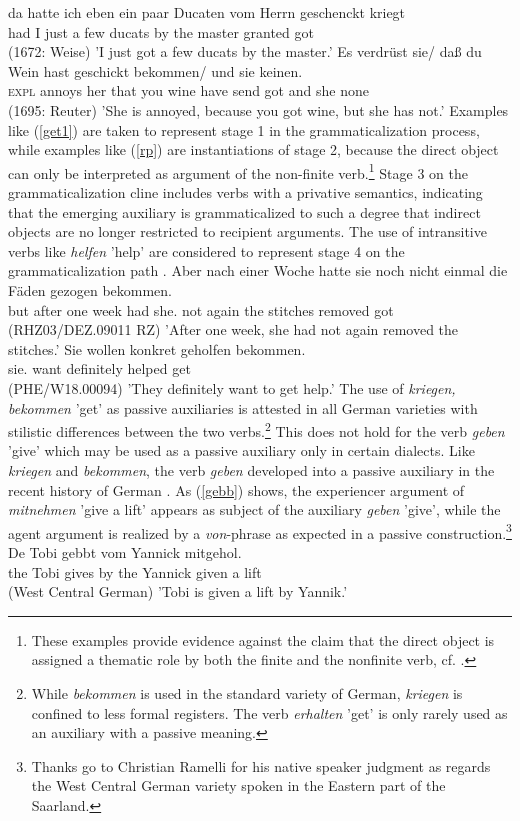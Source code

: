 \documentclass[output=paper]{langsci/langscibook}
\begin{document}
\eal \label{get1}
\ex
\gll da hatte ich eben ein paar Ducaten vom Herrn geschenckt kriegt \\  \expl{} had I just a few ducats {by the} master granted got   \\   \hfill (1672: Weise)
\glt 'I just got a few ducats by the master.' 
\ex
\gll  Es verdrüst sie/ daß du Wein hast geschickt bekommen/ und sie keinen.  \\  \textsc{expl} annoys her that you wine have send got and she none  \\ \hfill (1695: Reuter)
\glt 'She is annoyed, because you got wine, but she has not.'
\zl
Examples like (\ref{get1}) are taken to represent stage 1 in the grammaticalization process, while examples like (\ref{rp}) are instantiations of stage 2, because the direct object can only be interpreted as argument of the non-finite verb.\footnote{These examples provide evidence against the claim that the direct object is assigned a thematic role by both the finite and the nonfinite verb, cf. \cite{haider1986}.} Stage 3 on the grammaticalization cline includes verbs with a privative semantics, indicating that the emerging auxiliary is grammaticalized to such a degree that indirect objects are no longer restricted to recipient arguments. The use of intransitive verbs like \textit{helfen} 'help' are considered to represent stage 4 on the grammaticalization path \citep{ebert78}.
\eal \label{intrans}
\ex
\gll Aber nach einer Woche hatte sie {noch nicht einmal} die Fäden gezogen bekommen.  \\ but after one week had she.\nom {} {not again} the stitches removed got \\ \hfill (RHZ03/DEZ.09011 RZ)
\glt 'After one week, she had not again removed the stitches.'
\ex
\gll  Sie wollen konkret geholfen bekommen.  \\ sie.\nom {} want definitely helped get  \\ \hfill  (PHE/W18.00094)
\glt 'They definitely want to get help.'
\zl
The use of \textit{kriegen, bekommen} 'get' as passive auxiliaries is attested in all German varieties with stilistic differences between the two verbs.\footnote{While \textit{bekommen} is used in the standard variety of German, \textit{kriegen} is confined to less formal registers. The verb \textit{erhalten} 'get' is only rarely used as an auxiliary with a passive meaning.} This does not hold for the verb \textit{geben} 'give' which may be used as a passive auxiliary only in certain dialects. Like \textit{kriegen} and \textit{bekommen}, the verb \textit{geben} developed into a passive auxiliary in the recent history of German \citep{lenz2007}. As (\ref{gebb}) shows, the experiencer argument of \textit{mitnehmen} 'give a lift' appears as subject of the auxiliary \textit{geben} 'give', while the agent argument is realized by a \textit{von}-phrase as expected in a passive construction.\footnote{Thanks go to Christian Ramelli for his native speaker judgment as regards the West Central German variety spoken in the Eastern part of the Saarland.}
\ea \label{gebb}
\gll De Tobi gebbt vom Yannick mitgehol. \\
the Tobi gives {by the} Yannick {given a lift}   \\ \hfill (West Central German)
\glt 'Tobi is given a lift by Yannik.'
\z
\end{document}
